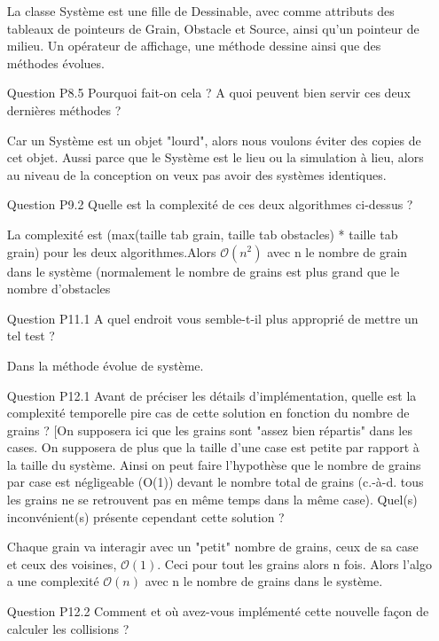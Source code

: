 \documentclass[a4paper,10pt]{article}
\begin{document}
\begin{itemize}
La classe Système est une fille de Dessinable, avec comme attributs des tableaux de pointeurs de Grain, Obstacle et Source, ainsi qu'un pointeur de milieu. Un opérateur de affichage, une méthode dessine ainsi que des méthodes évolues.


\item [Question P8.5] Pourquoi fait-on cela ? A quoi peuvent bien servir ces deux dernières méthodes ?

Car un Système est un objet "lourd", alors nous voulons éviter des copies de cet objet. Aussi parce que le Système est le lieu ou la simulation à lieu, alors au niveau de la conception on veux pas avoir des systèmes identiques.


\item [Question P9.2] Quelle est la complexité de ces deux algorithmes ci-dessus ?

La complexité est (max(taille tab grain, taille tab  obstacles)
* taille tab grain) pour les deux algorithmes.Alors $\mathcal{O}(n^{2})$
 avec n le nombre de grain dans le système (normalement le nombre de grains est plus grand que le nombre d'obstacles


\item [Question P11.1] A quel endroit vous semble-t-il plus approprié de mettre un tel test ?

Dans la méthode évolue de système.


\item [Question P12.1] Avant de préciser les détails d'implémentation, quelle est la complexité temporelle pire cas de cette solution en fonction du nombre de grains ? [On supposera ici que les grains sont "assez bien répartis" dans les cases. On supposera de plus que la taille d'une case est petite par rapport à la taille du système. Ainsi on peut faire l'hypothèse que le nombre de grains par case est négligeable (O(1)) devant le nombre total de grains (c.-à-d. tous les grains ne se retrouvent pas en même temps dans la même case).
Quel(s) inconvénient(s) présente cependant cette solution ?

Chaque grain va interagir avec un "petit" nombre de grains, ceux de sa case et ceux des voisines, $\mathcal{O}(1)$. Ceci pour tout les grains alors n fois.
Alors l'algo a une complexité $\mathcal{O}(n)$ avec n le nombre de grains dans le système.


\item [Question P12.2] Comment et où avez-vous implémenté cette nouvelle façon de calculer les collisions ?


\end{itemize}
\end{document}
